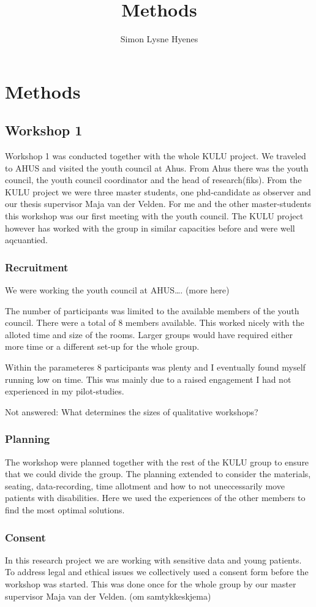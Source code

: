\documentclass[11pt,UKenglish, a4paper]{article}
\author{Simon Lysne Hyenes}
\title{Methods}
\begin{document}
\section{Methods}
\subsection{Workshop 1}
Workshop 1 was conducted together with the whole KULU project. We traveled to AHUS and visited the youth council at Ahus. From Ahus there was the youth council, the youth council coordinator and the head of research(fiks). From the KULU project we were three master students, one phd-candidate as observer and our thesis supervisor Maja van der Velden. For me and the other master-students this workshop was our first meeting with the youth council. The KULU project however has worked with the group in similar capacities before and were well aqcuantied. 
\subsubsection{Recruitment}
We were working the youth council at AHUS\dots. (more here)

The number of participants was limited to the available members of the youth council. There were a total of 8 members available. This worked nicely with the alloted time and size of the rooms. Larger groups would have required either more time or a different set-up for the whole group. 

Within the parameteres 8 participants was plenty and I eventually found myself running low on time. This was mainly due to a raised engagement I had not experienced in my pilot-studies. 

Not answered: What determines the sizes of qualitative workshops?

\subsubsection{Planning}
The workshop were planned together with the rest of the KULU group to ensure that we could divide the group. The planning extended to consider the materials, seating, data-recording, time allotment and how to not uneccessarily move patients with disabilities. Here we used the experiences of the other members to find the most optimal solutions. 
\subsubsection{Consent}
In this research project we are working with sensitive data and young patients. To address legal and ethical issues we collectively used a consent form before the workshop was started. This was done once for the whole group by our master supervisor Maja van der Velden. (om samtykkeskjema)
\end{document}
